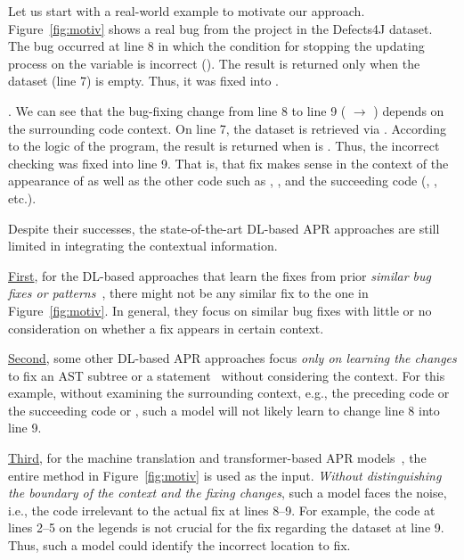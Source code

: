 Let us start with a real-world example to motivate our approach.
Figure~\ref{fig:motiv} shows a real bug from the project 
in the Defects4J dataset. The bug occurred at line 8 in which the
condition for stopping the updating process on the 
variable is incorrect (). The result is
returned only when the dataset (line 7) is empty. Thus, it was fixed
into .

. We
can see that the bug-fixing change from line 8 to line 9 ( $\rightarrow$ )
depends on the surrounding code context. On line 7, the dataset is
retrieved via . According to the logic of the
program, the result is returned when  is .
Thus, the incorrect checking was fixed into line 9. That is, that fix
makes sense in the context of the appearance of  as
well as the other code such as ,
, and the succeeding code
(, , etc.).

Despite their successes, the state-of-the-art DL-based APR approaches
are still limited in integrating the contextual information.

\underline{First}, for the DL-based approaches that learn the
fixes from prior {\em similar bug fixes or
  patterns}~\cite{gupta2017deepfix,white2019sorting,white2016deep},
there might not be any similar fix to the one in
Figure~\ref{fig:motiv}. In general, they focus on similar bug fixes
with little or no consideration on whether a fix appears in certain
context.

\underline{Second}, some other DL-based APR approaches focus {\em only
  on learning the changes} to fix an AST subtree or a
statement~\cite{chakrabortycodit,see2017get} without considering the
context. For this example, without examining the surrounding context,
e.g., the preceding code  or the succeeding code
 or , such a model will not
likely learn to change line 8 into line 9.


\underline{Third}, for the machine translation and transformer-based
APR
models~\cite{hata2018learning,tufano2019learning,tufano2018empirical},
the entire method in Figure~\ref{fig:motiv} is used as the input. {\em
  Without distinguishing the boundary of the context and the fixing
  changes}, such a model faces the noise, i.e., the code irrelevant to
the actual fix at lines 8--9. For example, the code at lines 2--5 on
the legends is not crucial for the fix regarding the dataset at line
9. Thus, such a model could identify the incorrect location to fix.

